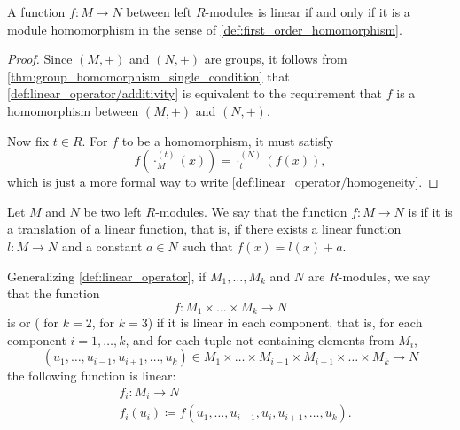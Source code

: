 \begin{proposition}\label{thm:map_is_linear_iff_homomorphism}
  A function \( f: M \to N \) between left \( R \)-modules is linear if and only if it is a module homomorphism in the sense of \cref{def:first_order_homomorphism}.
\end{proposition}
\begin{proof}
  Since \( (M, +) \) and \( (N, +) \) are groups, it follows from \cref{thm:group_homomorphism_single_condition} that \ref{def:linear_operator/additivity} is equivalent to the requirement that \( f \) is a homomorphism between \( (M, +) \) and \( (N, +) \).

  Now fix \( t \in R \). For \( f \) to be a homomorphism, it must satisfy
  \begin{equation*}
    f(\cdot_M^{(t)}(x)) = \cdot_t^{(N)}(f(x)),
  \end{equation*}
  which is just a more formal way to write \ref{def:linear_operator/homogeneity}.
\end{proof}

\begin{definition}\label{def:affine_operator}
  Let \( M \) and \( N \) be two left \( R \)-modules. We say that the function \( f: M \to N \) is  if it is a translation of a linear function, that is, if there exists a linear function \( l: M \to N \) and a constant \( a \in N \) such that \( f(x) = l(x) + a \).
\end{definition}

\begin{definition}\label{def:multilinear_function}
  Generalizing \cref{def:linear_operator}, if \( M_1, \ldots, M_k \) and \( N \) are \( R \)-modules, we say that the function
  \begin{equation*}
    f: M_1 \times \ldots \times M_k \to N
  \end{equation*}
  is  or  ( for \( k = 2 \),  for \( k = 3 \)) if it is linear in each component, that is, for each component \( i = 1, \ldots, k \), and for each tuple not containing elements from \( M_i \),
  \begin{equation*}
    (u_1, \ldots, u_{i-1}, u_{i+1}, \ldots, u_k) \in M_1 \times \ldots \times M_{i-1} \times M_{i+1} \times \ldots \times M_k \to N
  \end{equation*}
  the following function is linear:
  \begin{align*}
    &f_i: M_i \to N \\
    &f_i(u_i) \coloneqq f(u_1, \ldots, u_{i-1}, u_i, u_{i+1}, \ldots, u_k).
  \end{align*}
\end{definition}

